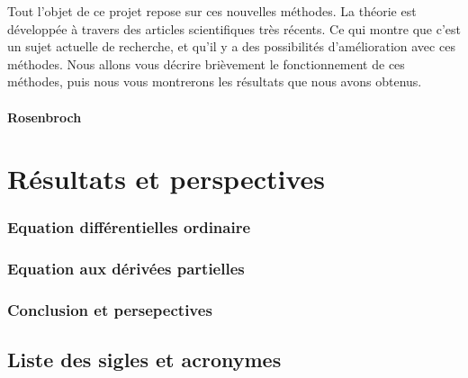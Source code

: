 \documentclass[a4paper,12pt]{report}
\makeatletter
\def\cleardoublepage{\clearpage\if@twoside \ifodd\c@page\else%
  \hbox{}%
  \thispagestyle{empty}%
  \newpage%
  \if@twocolumn\hbox{}\newpage\fi\fi\fi}
\theoremstyle{break}
\makeatother
\begin{document}
Tout l'objet de ce projet repose sur ces nouvelles méthodes. La théorie est développée à travers des articles scientifiques très récents. Ce qui montre que c'est un sujet actuelle de recherche, et qu'il y a des possibilités d'amélioration avec ces méthodes. Nous allons vous décrire brièvement le fonctionnement de ces méthodes, puis nous vous montrerons les résultats que nous avons obtenus.  
\subsection{Rosenbroch}

\part{Résultats et perspectives}

\section{Equation différentielles ordinaire}
	
\section{Equation aux dérivées partielles}
\section{Conclusion et persepectives}
\clearpage
\listoffigures

\clearpage
\chapter*{Liste des sigles et acronymes}
\begin{acronym}[CP-OFDMX] %
\end{acronym}




%
%
%
%
\end{document}
